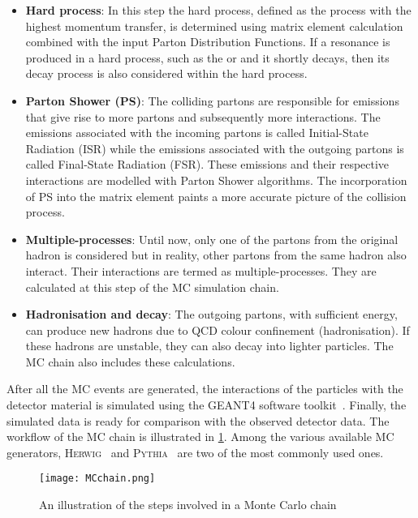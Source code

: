 \begin{itemize}
  \item \textbf{Hard process}: In this step the hard process, defined as the process with the highest
  momentum transfer, is determined using matrix element calculation combined with the input Parton
  Distribution Functions. If a resonance is produced in a hard process, such as the \Ptop or \PZ and it
  shortly decays, then its decay process is also considered within the hard process. 

  \item \textbf{Parton Shower (PS)}: The colliding partons are responsible for emissions that give rise
  to more partons and subsequently more interactions. The emissions associated with the incoming partons
  is called Initial-State Radiation (ISR) while the emissions associated with the outgoing partons is called
  Final-State Radiation (FSR). These emissions and their respective interactions are modelled with
  Parton Shower algorithms. The incorporation of PS into the matrix element paints a more accurate picture
  of the collision process.

  \item \textbf{Multiple-processes}: Until now, only one of the partons from the original hadron is 
  considered but in reality, other partons from the same hadron also interact. Their interactions are
  termed as multiple-processes. They are calculated at this step of the MC simulation chain.
  
  \item \textbf{Hadronisation and decay}: The outgoing partons, with sufficient energy, can produce 
  new hadrons due to QCD colour confinement (hadronisation). If these hadrons are unstable, they can also
  decay into lighter particles. The MC chain also includes these calculations.
\end{itemize}

After all the MC events are generated, the interactions of the particles with the detector material is
simulated using the \textsc{GEANT4} software toolkit~\cite{GEANT4:2002zbu}.
Finally, the simulated data is ready for comparison with the observed detector data. The workflow of 
the MC chain is illustrated in \cref{fig:MCchain}.
Among the various available MC generators, \textsc{Herwig}~\cite{Bellm2016} and 
\textsc{Pythia}~\cite{SJOSTRAND2008852} are two of the most commonly used ones.

\begin{figure}
  \centering
      \texttt{[image: MCchain.png]}
      \caption{An illustration of the steps involved in a Monte Carlo chain~\cite{Plehn:2022ftl}}
         \label{fig:MCchain}
\end{figure}

